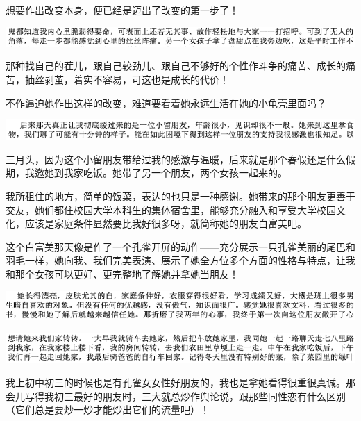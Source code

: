 \documentclass[9pt, b5paper]{article}
\begin{document}
想要作出改变本身，便已经是迈出了改变的第一步了！

\begin{center}
\includegraphics[width=.9\linewidth]{./pic/backups_plans_20210503_222749.png}
\end{center}

那种找自己的茬儿，跟自己较劲儿、跟自己不够好的个性作斗争的痛苦、成长的痛苦，抽丝剥茧，着实不容易，可这也是成长的代价！

不作逼迫她作出这样的改变，难道要看着她永远生活在她的小龟壳里面吗？

\begin{center}
\includegraphics[width=.9\linewidth]{./pic/backups_plans_20210503_222916.png}
\end{center}

三月头，因为这个小留朋友带给过我的感激与温暖，后来就是那个春假还是什么假期，我邀她到我家吃饭。她带了另一个朋友，两个女孩一起来的。 

我所租住的地方，简单的饭菜，表达的也只是一种感谢。她带来的那个朋友更善于交友，她们都住校园大学本科生的集体宿舍里，能够充分融入和享受大学校园文化，应该是家庭条件显然要比我好很多呀，就简称她的朋友白富美吧。

这个白富美那天像是作了一个孔雀开屏的动作——充分展示一只孔雀美丽的尾巴和羽毛一样，她向我、我们完美表演、展示了她全方位多个方面的性格与特点，让我和那个女孩可以更好、更完整地了解她并拿她当朋友！

\begin{center}
\includegraphics[width=.9\linewidth]{./pic/backups_plans_20210503_225816.png}
\end{center}

\begin{center}
\includegraphics[width=.9\linewidth]{./pic/backups_plans_20210503_225920.png}
\end{center}

我上初中初三的时候也是有孔雀女女性好朋友的，我也是拿她看得很重很真诚。那会儿写得我初三最好的朋友时，三大就总炒作舆论说，跟那些同性恋有什么区别（它们总是要炒一炒才能炒出它们的流量吧）！
\end{document}
